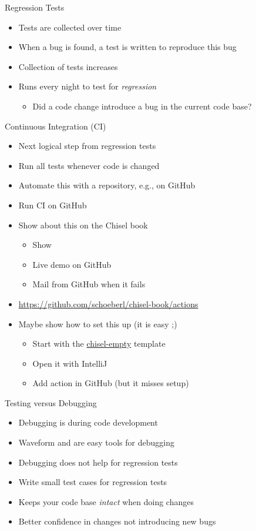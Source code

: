 \begin{frame}[fragile]{Regression Tests}
\begin{itemize}
\item Tests are collected over time
\item When a bug is found, a test is written to reproduce this bug
\item Collection of tests increases
\item Runs every night to test for \emph{regression}
\begin{itemize}
\item Did a code change introduce a bug in the current code base?
\end{itemize}
\end{itemize}
\end{frame}


\begin{frame}[fragile]{Continuous Integration (CI)}
\begin{itemize}
\item Next logical step from regression tests
\item Run all tests whenever code is changed
\item Automate this with a repository, e.g., on GitHub
\item Run CI on GitHub
\item Show about this on the Chisel book
\begin{itemize}
\item Show 
\item Live demo on GitHub
\item Mail from GitHub when it fails
\end{itemize}
\item \url{https://github.com/schoeberl/chisel-book/actions}
\item Maybe show how to set this up (it is easy ;)
\begin{itemize}
\item Start with the \href{https://github.com/schoeberl/chisel-empty}{chisel-empty} template
\item Open it with IntelliJ
\item Add action in GitHub (but it misses  setup)
\end{itemize}
\end{itemize}
\end{frame}

\begin{frame}[fragile]{Testing versus Debugging}
\begin{itemize}
\item Debugging is during code development
\item Waveform and  are easy tools for debugging
\item Debugging does not help for regression tests
\item Write small test cases for regression tests
\item Keeps your code base \emph{intact} when doing changes
\item Better confidence in changes not introducing new bugs
\end{itemize}
\end{frame}


